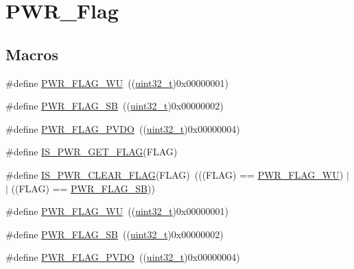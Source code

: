\hypertarget{group___p_w_r___flag}{}\section{P\+W\+R\+\_\+\+Flag}
\label{group___p_w_r___flag}
\subsection*{Macros}
\begin{DoxyCompactItemize}
\item 
\#define \hyperlink{group___p_w_r___flag_ga2d06760a5769e729b06d41e37036d58e}{P\+W\+R\+\_\+\+F\+L\+A\+G\+\_\+\+WU}~((\hyperlink{_p_e___types_8h_a33594304e786b158f3fb30289278f5af}{uint32\+\_\+t})0x00000001)
\item 
\#define \hyperlink{group___p_w_r___flag_ga9e55f0b5dec2346d5c8dee3ab3c0c2df}{P\+W\+R\+\_\+\+F\+L\+A\+G\+\_\+\+SB}~((\hyperlink{_p_e___types_8h_a33594304e786b158f3fb30289278f5af}{uint32\+\_\+t})0x00000002)
\item 
\#define \hyperlink{group___p_w_r___flag_gaefd05d58cc050eeef83a1b5c520b2c2a}{P\+W\+R\+\_\+\+F\+L\+A\+G\+\_\+\+P\+V\+DO}~((\hyperlink{_p_e___types_8h_a33594304e786b158f3fb30289278f5af}{uint32\+\_\+t})0x00000004)
\item 
\#define \hyperlink{group___p_w_r___flag_gadc822638d0dd52d2f920808dd96c00a1}{I\+S\+\_\+\+P\+W\+R\+\_\+\+G\+E\+T\+\_\+\+F\+L\+AG}(F\+L\+AG)
\item 
\#define \hyperlink{group___p_w_r___flag_ga36d35a770e683e4a0baf3aac350fcb5a}{I\+S\+\_\+\+P\+W\+R\+\_\+\+C\+L\+E\+A\+R\+\_\+\+F\+L\+AG}(F\+L\+AG)~(((F\+L\+AG) == \hyperlink{openmotestm_2library_2inc_2stm32f10x__pwr_8h_a2d06760a5769e729b06d41e37036d58e}{P\+W\+R\+\_\+\+F\+L\+A\+G\+\_\+\+WU}) $\vert$$\vert$ ((F\+L\+AG) == \hyperlink{openmotestm_2library_2inc_2stm32f10x__pwr_8h_a9e55f0b5dec2346d5c8dee3ab3c0c2df}{P\+W\+R\+\_\+\+F\+L\+A\+G\+\_\+\+SB}))
\item 
\#define \hyperlink{group___p_w_r___flag_ga2d06760a5769e729b06d41e37036d58e}{P\+W\+R\+\_\+\+F\+L\+A\+G\+\_\+\+WU}~((\hyperlink{_p_e___types_8h_a33594304e786b158f3fb30289278f5af}{uint32\+\_\+t})0x00000001)
\item 
\#define \hyperlink{group___p_w_r___flag_ga9e55f0b5dec2346d5c8dee3ab3c0c2df}{P\+W\+R\+\_\+\+F\+L\+A\+G\+\_\+\+SB}~((\hyperlink{_p_e___types_8h_a33594304e786b158f3fb30289278f5af}{uint32\+\_\+t})0x00000002)
\item 
\#define \hyperlink{group___p_w_r___flag_gaefd05d58cc050eeef83a1b5c520b2c2a}{P\+W\+R\+\_\+\+F\+L\+A\+G\+\_\+\+P\+V\+DO}~((\hyperlink{_p_e___types_8h_a33594304e786b158f3fb30289278f5af}{uint32\+\_\+t})0x00000004)
$$
\end{DoxyCompactItemize}
